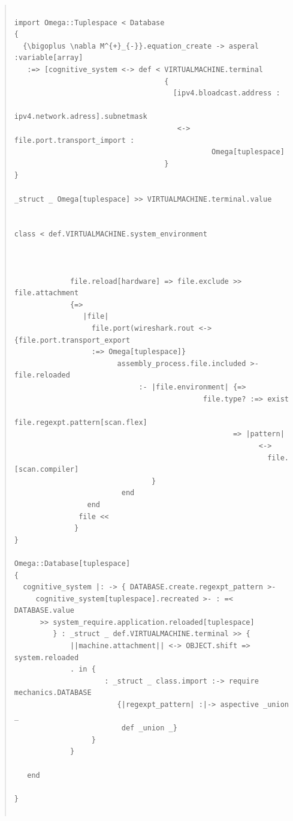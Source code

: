 \documentclass{jsarticle}
\begin{document}
\begin{quote}
\setlength{\baselineskip}{12pt}
\begin{verbatim}

import Omega::Tuplespace < Database
{
  {\bigoplus \nabla M^{+}_{-}}.equation_create -> asperal :variable[array]
   :=> [cognitive_system <-> def < VIRTUALMACHINE.terminal
                                   {
                                     [ipv4.bloadcast.address : 
                                       ipv4.network.adress].subnetmask
                                      <-> file.port.transport_import :
                                              Omega[tuplespace]
                                   }
}

_struct _ Omega[tuplespace] >> VIRTUALMACHINE.terminal.value


class < def.VIRTUALMACHINE.system_environment



             file.reload[hardware] => file.exclude >> file.attachment
             {=>
                |file|
                  file.port(wireshark.rout <-> {file.port.transport_export 
                  :=> Omega[tuplespace]}
                        assembly_process.file.included >- file.reloaded
                             :- |file.environment| {=>
                                            file.type? :=> exist
                                              file.regexpt.pattern[scan.flex]
                                                   => |pattern|
                                                         <->
                                                           file.[scan.compiler]
                                }              
                         end
                 end
               file <<
              }
}

Omega::Database[tuplespace]
{
  cognitive_system |: -> { DATABASE.create.regexpt_pattern >-
     cognitive_system[tuplespace].recreated >- : =< DATABASE.value 
      >> system_require.application.reloaded[tuplespace]
         } : _struct _ def.VIRTUALMACHINE.terminal >> {
             ||machine.attachment|| <-> OBJECT.shift => system.reloaded                  
             . in {
                     : _struct _ class.import :-> require mechanics.DATABASE
                        {|regexpt_pattern| :|-> aspective _union _
                         def _union _} 
                  }
             }
     
   end                    
                       
}


\end{verbatim}
\end{quote}
\end{document}

